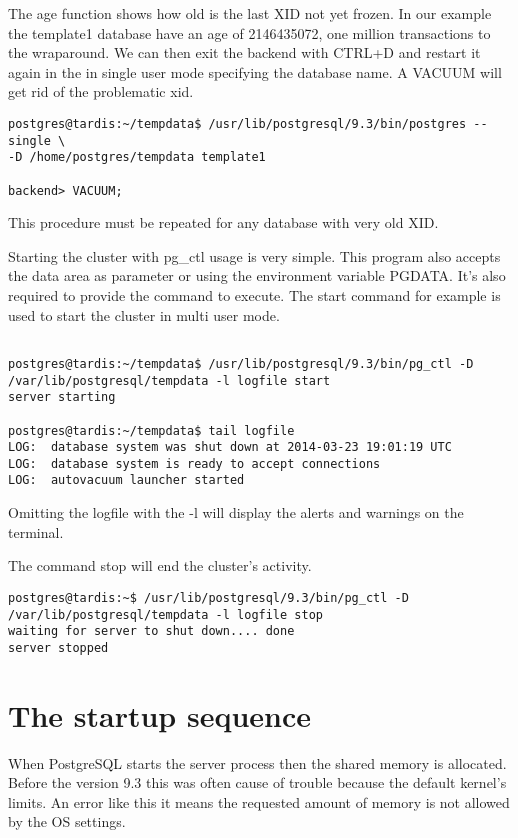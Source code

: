The age function shows how old is the last XID not yet frozen. In our example the template1
database have an age of 2146435072, one million transactions to the wraparound. We can then exit 
the backend with CTRL+D and restart it again in the in single user mode specifying the database 
name. A VACUUM will get rid of the problematic xid.

\begin{verbatim}
postgres@tardis:~/tempdata$ /usr/lib/postgresql/9.3/bin/postgres --single \
-D /home/postgres/tempdata template1

backend> VACUUM;
\end{verbatim}

This procedure must be repeated for any database with very old XID.\newline

Starting the cluster with pg\_ctl usage is very simple. This program also accepts the data area as 
parameter or using the environment variable PGDATA. It's also required to provide the command to 
execute. The start command for example is used to start the cluster in multi user mode.

\begin{verbatim}

postgres@tardis:~/tempdata$ /usr/lib/postgresql/9.3/bin/pg_ctl -D 
/var/lib/postgresql/tempdata -l logfile start
server starting

postgres@tardis:~/tempdata$ tail logfile 
LOG:  database system was shut down at 2014-03-23 19:01:19 UTC
LOG:  database system is ready to accept connections
LOG:  autovacuum launcher started

\end{verbatim}
Omitting the logfile with the -l will display the alerts and warnings on the terminal.

The command stop will end the cluster's activity.

\begin{verbatim}
postgres@tardis:~$ /usr/lib/postgresql/9.3/bin/pg_ctl -D 
/var/lib/postgresql/tempdata -l logfile stop
waiting for server to shut down.... done
server stopped
\end{verbatim}

\section{The startup sequence}
\label{sec:STARTUP}

When PostgreSQL starts the server process then the shared memory is allocated. Before the version
9.3 this was often cause of trouble because the default kernel's limits. An error like this it
means the requested amount of memory is not allowed by the OS settings.

